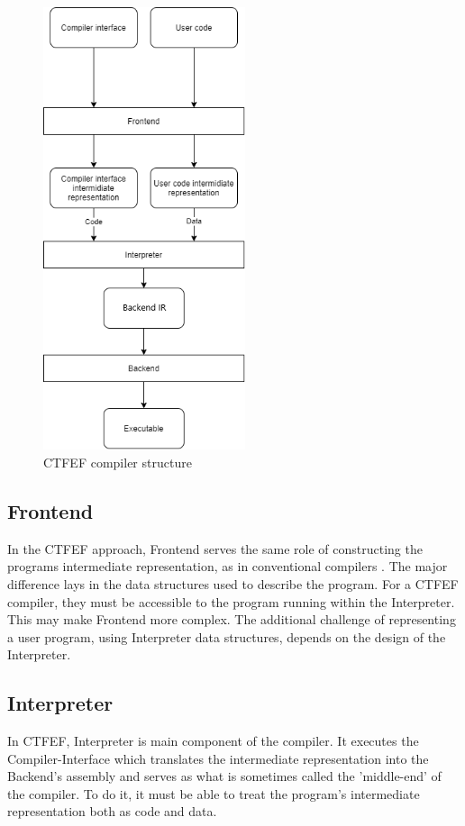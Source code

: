 \begin{figure}
	\includegraphics[height=13cm]{pictures/compiler-structure.png}
	\caption{CTFEF compiler structure}
	\label{CTFE-first-compiler-structure}
\end{figure}

\subsection{Frontend}
\label{Frontend}

In the CTFEF approach, Frontend serves the same role of constructing the programs intermediate representation, as in conventional compilers \cite{puntambekar:compiler_design}.
The major difference lays in the data structures used to describe the program.
For a CTFEF compiler, they must be accessible to the program running within the Interpreter.
This may make Frontend more complex.
The additional challenge of representing a user program, using Interpreter data structures, depends on the design of the Interpreter.


\subsection{Interpreter}
\label{Interpreter}

In CTFEF, Interpreter is main component of the compiler.
It executes the Compiler-Interface which translates the intermediate representation into the Backend's assembly and serves as what is sometimes called the 'middle-end' of the compiler\cite{hsu2021llvm}.
To do it, it must be able to treat the program's intermediate representation both as code and data.


